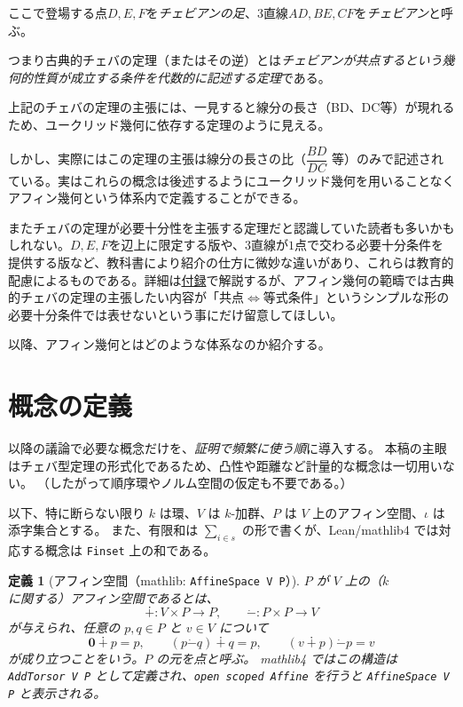 \documentclass[a4paper,12pt]{bxjsbook}
\newlength{\customindent}
\newenvironment{body}{
  \par
  \begingroup
  \setlength{\leftskip}{\customindent}
  \setlength{\rightskip}{0pt}
  \setlength{\parindent}{1em}
  \setlength{\displayindent}{\customindent}
  \setlength{\displaywidth}{\dimexpr\linewidth-\customindent\relax}
}{
  \par
  \endgroup
}
\theoremstyle{theorem}
\newtheorem{definition}[theorem]{定義}
\newcommand{\dotminus}{\mathbin{\dot{-}}}
\begin{document}
    \begin{body}
        \indent ここで登場する点$D,E,F$を\emph{チェビアンの足}、$3$直線$AD,BE,CF$を\emph{チェビアン}と呼ぶ。

        \indent つまり古典的チェバの定理（またはその逆）とは\emph{チェビアンが共点するという幾何的性質が成立する条件を代数的に記述する定理}である。

        \indent 上記のチェバの定理の主張には、一見すると線分の長さ（BD、DC等）が現れるため、ユークリッド幾何に依存する定理のように見える。

        \indent しかし、実際にはこの定理の主張は線分の長さの比（$\dfrac{BD}{DC}$ 等）のみで記述されている。実はこれらの概念は後述するようにユークリッド幾何を用いることなくアフィン幾何という体系内で定義することができる。

        \indent またチェバの定理が必要十分性を主張する定理だと認識していた読者も多いかもしれない。$D,E,F$を辺上に限定する版や、$3$直線が$1$点で交わる必要十分条件を提供する版など、教科書により紹介の仕方に微妙な違いがあり、これらは教育的配慮によるものである。詳細は\hyperref[appendix:classical-ceva-version]{付録}で解説するが、アフィン幾何の範疇では古典的チェバの定理の主張したい内容が「共点$⇔$等式条件」というシンプルな形の必要十分条件では表せないという事にだけ留意してほしい。

        \indent 以降、アフィン幾何とはどのような体系なのか紹介する。
    \end{body}

    
    \section{概念の定義}\label{sec:affine-prelim}
    \begin{body}
        \indent 以降の議論で必要な概念だけを、\emph{証明で頻繁に使う順}に導入する。
        本稿の主眼はチェバ型定理の形式化であるため、凸性や距離など計量的な概念は一切用いない。
        （したがって順序環やノルム空間の仮定も不要である。）

        \indent 以下、特に断らない限り $k$ は環、$V$ は $k$-加群、$P$ は $V$ 上のアフィン空間、$\iota$ は添字集合とする。
        また、有限和は $\sum_{i\in s}$ の形で書くが、Lean/mathlib4 では対応する概念は \texttt{Finset} 上の和である。
    \end{body}

    \begin{definition}[アフィン空間（mathlib: \texttt{AffineSpace V P}）]
        $P$ が $V$ 上の（$k$ に関する）\emph{アフィン空間}であるとは、
        \[
          \dotplus : V\times P \to P,\qquad \dotminus : P\times P \to V
        \]
        が与えられ、任意の $p,q\in P$ と $v\in V$ について
        \[
          \mathbf 0 \dotplus p = p,\qquad (p\dotminus q)\dotplus q = p,\qquad (v\dotplus p)\dotminus p = v
        \]
        が成り立つことをいう。$P$ の元を\emph{点}と呼ぶ。
        mathlib4 ではこの構造は \texttt{AddTorsor V P} として定義され、\texttt{open scoped Affine} を行うと \texttt{AffineSpace V P} と表示される。
    \end{definition}
\end{document}
